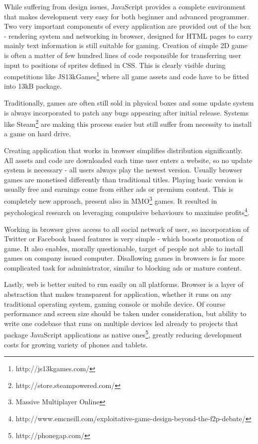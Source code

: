 While suffering from design issues, JavaScript provides a complete environment that makes development very easy for both beginner and advanced programmer. Two very important components of every application are provided out of the box - rendering system and networking in browser, designed for HTML pages to carry mainly text information is still suitable for gaming. Creation of simple 2D game is often a matter of few hundred lines of code responsible for transferring user input to positions of sprites defined in CSS. This is clearly visible during competitions like JS13kGames\footnote{http://js13kgames.com/} where all game assets and code have to be fitted into 13kB package.

Traditionally, games are often still sold in physical boxes and some update system is always incorporated to patch any bugs appearing after initial release. Systems like Steam\footnote{http://store.steampowered.com/} are making this process easier but still suffer from necessity to install a game on hard drive.

Creating application that works in browser simplifies distribution significantly. All assets and code are downloaded each time user enters a website, so no update system is necessary - all users always play the newest version. Usually browser games are monetised differently than traditional titles. Playing basic version is usually free and earnings come from either ads or premium content. This is completely new approach, present also in MMO\footnote{Massive Multiplayer Online} games. It resulted in psychological research on leveraging compulsive behaviours to maximise profits\footnote{http://www.emcneill.com/exploitative-game-design-beyond-the-f2p-debate/}.

Working in browser gives access to all social network of user, so incorporation of Twitter or Facebook based features is very simple - which boosts promotion of game. It also enables, morally questionable, target of people not able to install games on company issued computer. Disallowing games in browsers is far more complicated task for administrator, similar to blocking ads or mature content.

Lastly, web is better suited to run easily on all platforms. Browser is a layer of abstraction that makes transparent for application, whether it runs on any traditional operating system, gaming console or mobile device. Of course  performance and screen size should be taken under consideration, but ability to write one codebase that runs on multiple devices led already to projects that package JavaScript applications as native ones\footnote{http://phonegap.com/}, greatly reducing development costs for growing variety of phones and tablets.

